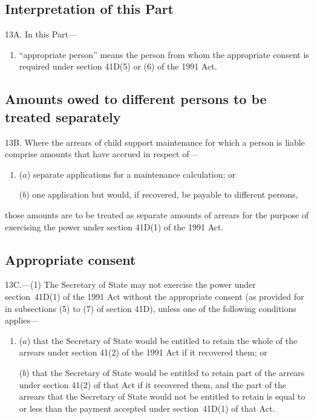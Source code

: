 \documentclass[12pt,a4paper]{article}
\begin{document}
\renewcommand\parthead{--- Part IVA}


\subsection[13A. Interpretation of this Part]{Interpretation of this Part}

13A.  In this Part—
\begin{enumerate}\item[]
“appropriate person” means the person from whom the appropriate consent is required under section 41D(5) or (6) of the 1991 Act.
\end{enumerate}

\subsection[13B. Amounts owed to different persons to be treated separately]{Amounts owed to different persons to be treated separately}

13B.  Where the arrears of child support maintenance for which a person is liable comprise amounts that have accrued in respect of—
\begin{enumerate}\item[]
($a$) separate applications for a maintenance calculation; or

($b$) one application but would, if recovered, be payable to different persons,
\end{enumerate}
those amounts are to be treated as separate amounts of arrears for the purpose of exercising the power under section 41D(1) of the 1991 Act.

\subsection[13C. Appropriate consent]{Appropriate consent}

13C.---(1)  The Secretary of State may not exercise the power under section~41D(1) of the 1991 Act without the appropriate consent (as provided for in subsections (5) to (7) of section 41D), unless one of the following conditions applies—
\begin{enumerate}\item[]
($a$) that the Secretary of State would be entitled to retain the whole of the arrears under section 41(2) of the 1991 Act if it recovered them; or

($b$) that the Secretary of State would be entitled to retain part of the arrears under section 41(2) of that Act if it recovered them, and the part of the arrears that the Secretary of State would not be entitled to retain is equal to or less than the payment accepted under section~41D(1) of that Act.
\end{enumerate}
\end{document}
